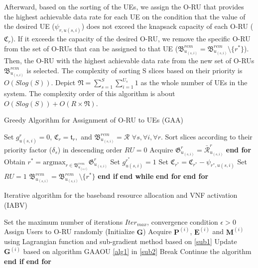 \documentclass[lettersize,journal]{IEEEtran}
\begin{document}
Afterward, based on the sorting of the UEs,
we assign the O-RU that provides the highest achievable data rate for each UE on the condition that the value of the desired UE ($\psi_{r,u(s,i)}$) does not exceed the knapsack capacity of each O-RU ($ \mathfrak{C}_r$).
If it exceeds the capacity of the desired O-RU, we remove the specific O-RU from the set of O-RUs that can be assigned to that UE (${\mathfrak{B}}^{rem}_{u_{(s,i)}} = {\mathfrak{B}}^{rem}_{u_{(s,i)}} \setminus \{{r^*}\} $). Then, the O-RU with the highest achievable data rate from the new set of O-RUs ${\mathfrak{B}}^{rem}_{u_{(s,i)}}$ is selected. 
The complexity of sorting S slices based on their priority is $O(Slog(S))$.
Depict $\mathfrak{N} =  \sum_{s=1}^S\sum_{i=1}^{U_s} 1$ as the whole number of UEs in the system. 
The complexity order of this algorithm is about $O(Slog(S)) + O(R\times \mathfrak{N})$.
\begin{algorithm}
\small
\caption{Greedy Algorithm for Assignment of O-RU to UEs (GAA)}\label{alg1}
\begin{algorithmic}[1]
\State Set $g^r_{u(s,i)} = 0$, $\mathfrak{C}_r = \mathfrak{t}_r,$ and ${\mathfrak{B}}^{rem}_{u_{(s,i)}} = \mathcal{R}$   $\forall s, \forall i, \forall r$.\label{31}
\State Sort slices according to their priority factor ($\delta_s$) in descending order
\label{33}
\State $RU = 0$
\State Acquire $\mathfrak{G}^r_{u_{(s,i)}} = \bar{\mathcal{R}}^r_{u_{(s,i)}}$
\EndFor
\State \textbf{end for}
\State Obtain $r^* = \text{argmax}_{r\in{\mathfrak{B}}^{rem}_{u_{(s,i)}}} \mathfrak{G}^r_{u_{(s,i)}}$
\State Set $g^{r^*}_{u(s,i)} = 1$ 
\State Set  $\mathfrak{C}_{r^*} = \mathfrak{C}_{r^*} - \psi_{{r^*},u(s,i)}$
\State Set $RU = 1$ 
\Else
\State  ${\mathfrak{B}}^{rem}_{u_{(s,i)}} = {\mathfrak{B}}^{rem}_{u_{(s,i)}} \setminus \{{r^*}\} $
\EndIf
\State \textbf{end if}
\EndWhile
\State \textbf{end while}
\EndFor
\State \textbf{end for}
\EndFor
\State \textbf{end for} \label{34}
\end{algorithmic}
\end{algorithm}

 \begin{algorithm}
 \small
\caption{Iterative algorithm for the baseband resource allocation and VNF activation (IABV)}\label{alg2}
\begin{algorithmic}[1]
\State  Set the maximum number of iterations ${Iter}_{max}$, convergence condition $\epsilon > 0$ \label{a21}
\State  Assign Users to O-RU randomly (Initialize $\boldsymbol{G}$) \label{a22}
\label{23}
\State Acquire $\boldsymbol{P}^{(i)}$, $\boldsymbol{E}^{(i)}$ and $\boldsymbol{M}^{(i)}$ using Lagrangian function and sub-gradient method based on \eqref{sub1}
\State Update $\boldsymbol{G}^{(i)}$   based on algorithm GAAOU \eqref{alg1} in  \eqref{sub2}
\State Break
\Else 
\State Continue the algorithm  
\EndIf
\State \textbf{end if}
\EndFor
\State \textbf{end for} \label{24}
\end{algorithmic}
\end{algorithm} 
\end{document}
